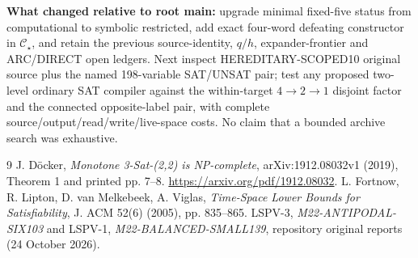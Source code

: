 \documentclass[11pt]{article}
\newcommand{\CS}{\mathcal C_\star}
\begin{document}
\textbf{What changed relative to root main:} upgrade minimal fixed-five status from computational to symbolic restricted, add exact four-word defeating constructor in $\CS$, and retain the previous source-identity, $q/h$, expander-frontier and ARC/DIRECT open ledgers. Next inspect HEREDITARY-SCOPED10 original source plus the named 198-variable SAT/UNSAT pair; test any proposed two-level ordinary SAT compiler against the within-target $4\to2\to1$ disjoint factor and the connected opposite-label pair, with complete source/output/read/write/live-space costs. No claim that a bounded archive search was exhaustive.

\begin{thebibliography}{9}
 J. D\"ocker, \emph{Monotone 3-Sat-(2,2) is NP-complete}, arXiv:1912.08032v1 (2019), Theorem 1 and printed pp. 7--8. \url{https://arxiv.org/pdf/1912.08032}.
 L. Fortnow, R. Lipton, D. van Melkebeek, A. Viglas, \emph{Time-Space Lower Bounds for Satisfiability}, J. ACM 52(6) (2005), pp. 835--865.
 LSPV-3, \emph{M22-ANTIPODAL-SIX103} and LSPV-1, \emph{M22-BALANCED-SMALL139}, repository original reports (24 October 2026).
\end{thebibliography}
\end{document}
